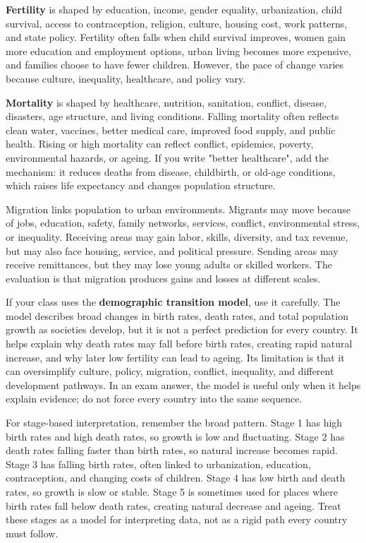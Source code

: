 \documentclass[11pt,a4paper]{article}
\newcommand{\term}[1]{\textcolor{HeadingBlue}{\textbf{#1}}}
\begin{document}
\term{Fertility} is shaped by education, income, gender equality, urbanization,
child survival, access to contraception, religion, culture, housing cost, work
patterns, and state policy. Fertility often falls when child survival improves,
women gain more education and employment options, urban living becomes more
expensive, and families choose to have fewer children. However, the pace of
change varies because culture, inequality, healthcare, and policy vary.

\term{Mortality} is shaped by healthcare, nutrition, sanitation, conflict,
disease, disasters, age structure, and living conditions. Falling mortality
often reflects clean water, vaccines, better medical care, improved food supply,
and public health. Rising or high mortality can reflect conflict, epidemics,
poverty, environmental hazards, or ageing. If you write "better healthcare",
add the mechanism: it reduces deaths from disease, childbirth, or old-age
conditions, which raises life expectancy and changes population structure.

Migration links population to urban environments. Migrants may move because of
jobs, education, safety, family networks, services, conflict, environmental
stress, or inequality. Receiving areas may gain labor, skills, diversity, and
tax revenue, but may also face housing, service, and political pressure. Sending
areas may receive remittances, but they may lose young adults or skilled workers.
The evaluation is that migration produces gains and losses at different scales.

If your class uses the \term{demographic transition model}, use it carefully.
The model describes broad changes in birth rates, death rates, and total
population growth as societies develop, but it is not a perfect prediction for
every country. It helps explain why death rates may fall before birth rates,
creating rapid natural increase, and why later low fertility can lead to ageing.
Its limitation is that it can oversimplify culture, policy, migration, conflict,
inequality, and different development pathways. In an exam answer, the model is
useful only when it helps explain evidence; do not force every country into the
same sequence.

For stage-based interpretation, remember the broad pattern. Stage 1 has high
birth rates and high death rates, so growth is low and fluctuating. Stage 2 has
death rates falling faster than birth rates, so natural increase becomes rapid.
Stage 3 has falling birth rates, often linked to urbanization, education,
contraception, and changing costs of children. Stage 4 has low birth and death
rates, so growth is slow or stable. Stage 5 is sometimes used for places where
birth rates fall below death rates, creating natural decrease and ageing. Treat
these stages as a model for interpreting data, not as a rigid path every country
must follow.
\end{document}
